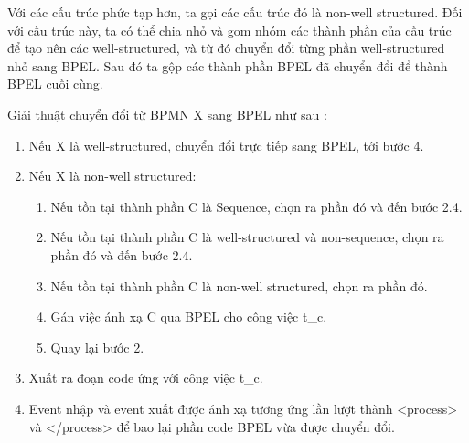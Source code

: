 \par Với các cấu trúc phức tạp hơn, ta gọi các cấu trúc đó là non-well structured. Đối với cấu trúc này, ta có thể chia nhỏ và gom nhóm các thành phần của cấu trúc để tạo nên các well-structured, và từ đó chuyển đổi từng phần well-structured nhỏ sang BPEL. 
Sau đó ta gộp các thành phần BPEL đã chuyển đổi để thành BPEL cuối cùng.

\par Giải thuật chuyển đổi từ BPMN X sang BPEL như sau \cite{theoryConvert}:
\begin{enumerate}
	\item Nếu X là well-structured, chuyển đổi trực tiếp sang BPEL, tới bước 4.
	\item Nếu X là non-well structured:
	\begin{enumerate}
		\item Nếu tồn tại thành phần C là Sequence, chọn ra phần đó và đến bước 2.4.
		\item Nếu tồn tại thành phần C là well-structured và non-sequence, chọn ra phần đó và đến bước 2.4.
		\item Nếu tồn tại thành phần C là non-well structured, chọn ra phần đó.
		\item Gán việc ánh xạ C qua BPEL cho công việc t\_{c}.
		\item Quay lại bước 2.
	\end{enumerate}
	\item Xuất ra đoạn code ứng với công việc t\_{c}.
	\item Event nhập và event xuất được ánh xạ tương ứng lần lượt thành <process> và </process> để bao lại phần code BPEL vừa được chuyển đổi.
\end{enumerate}